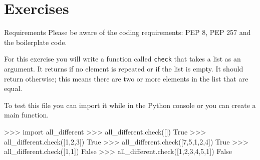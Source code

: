 \documentclass[11pt]{cselabheader}
\begin{document}
\pagebreak
\section{Exercises}
\label{sec:ex}


\begin{warningbox}{Requirements}
  Please be aware of the coding requirements: PEP 8, PEP 257
  and the boilerplate code.
\end{warningbox}

\begin{ex}
For this exercise you will write a function called  \texttt{check} that takes
a list as an argument. It returns  if no element is
repeated or if the list is empty. It should return 
otherwise; this means there are two or more elements in the list that are equal.

To test this file you can import it while in the Python console or you can
create a main function.

\begin{pyconcode}
>>> import all_different
>>> all_different.check([])
True
>>> all_different.check([1,2,3])
True
>>> all_different.check([7,5,1,2,4])
True
>>> all_different.check([1,1])
False
>>> all_different.check([1,2,3,4,5,1])
False
\end{pyconcode}
\end{ex}
\end{document}
